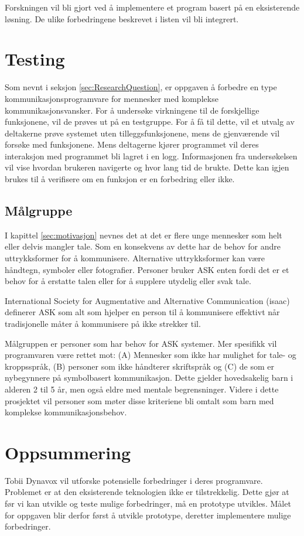 Forskningen vil bli gjort ved å implementere et program basert på en eksisterende løsning. De ulike forbedringene beskrevet i listen vil bli integrert.

\section{Testing}

Som nevnt i seksjon \ref{sec:ResearchQuestion}, er oppgaven å forbedre en type kommunikasjonsprogramvare for mennesker med komplekse kommunikasjonsvansker. For å undersøke virkningene til de forskjellige funksjonene, vil de prøves ut på en testgruppe. For å få til dette, vil et utvalg av deltakerne prøve systemet uten tilleggsfunksjonene, mens de gjenværende vil forsøke med funksjonene. Mens deltagerne kjører programmet vil deres interaksjon med programmet bli lagret i en logg. Informasjonen fra undersøkelsen vil vise hvordan brukeren navigerte og hvor lang tid de brukte. Dette kan igjen brukes til å verifisere om en funksjon er en forbedring eller ikke.

\subsection{Målgruppe}

I kapittel \ref{sec:motivasjon} nevnes det at det er flere unge mennesker som helt eller delvis mangler tale. Som en konsekvens av dette har de behov for andre uttrykksformer for å kommunisere. Alternative uttrykksformer kan være håndtegn, symboler eller fotografier. Personer bruker ASK enten fordi det er et behov for å erstatte talen eller for å supplere utydelig eller svak tale.

International Society for Augmentative and Alternative Communication (\gls{isaac}) \cite{HvaErASK} definerer ASK som alt som hjelper en person til å kommunisere effektivt når tradisjonelle måter å kommunisere på ikke strekker til.

Målgruppen er personer som har behov for ASK systemer. Mer spesifikk vil programvaren være rettet mot: (A) Mennesker som ikke har mulighet for tale- og kroppsspråk,  (B) personer som ikke håndterer skriftspråk og (C) de som er nybegynnere på symbolbasert kommunikasjon. Dette gjelder hovedsakelig barn i alderen 2 til 5 år, men også eldre med mentale begrensninger. Videre i dette prosjektet vil personer som møter disse kriteriene bli omtalt som barn med komplekse kommunikasjonsbehov. 


\section{Oppsummering}

Tobii Dynavox vil utforske potensielle forbedringer i deres programvare. Problemet er at den eksisterende teknologien ikke er tilstrekkelig. Dette gjør at før vi kan utvikle og teste mulige forbedringer, må en prototype utvikles. Målet for oppgaven blir derfor først å utvikle prototype, deretter implementere mulige forbedringer.